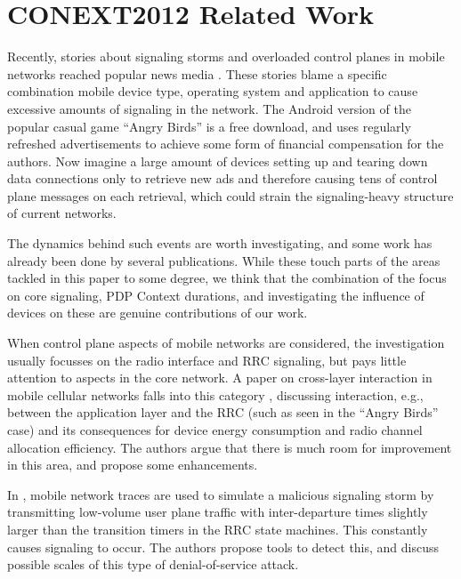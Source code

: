 \section{CONEXT2012 Related Work}



Recently, stories about signaling storms and overloaded control planes in mobile networks reached popular news media \cite{it2011birdandroid, lt2012docostorm}. These stories blame a specific combination mobile device type, operating system and application to cause excessive amounts of signaling in the network. The Android version of the popular casual game ``Angry Birds'' is a free download, and  uses regularly refreshed advertisements to achieve some form of financial compensation for the authors. Now imagine a large amount of devices setting up and tearing down data connections only to retrieve new ads and therefore causing tens of control plane messages on each retrieval, which could strain the signaling-heavy structure of current networks. 

The dynamics behind such events are worth investigating, and some work has already been done by several publications. While these touch parts of the areas tackled in this paper to some degree, we think that the combination of the focus on core signaling, PDP Context durations, and investigating the influence of devices on these are genuine contributions of our work.

When control plane aspects of mobile networks are considered, the investigation usually focusses on the radio interface and \ac{RRC} signaling, but pays little attention to aspects in the core network. A paper on cross-layer interaction in mobile cellular networks falls into this category \cite{qian2011profiling}, discussing interaction, e.g., between the application layer and the \ac{RRC} (such as seen in the ``Angry Birds'' case) and its consequences for device energy consumption and radio channel allocation efficiency. The authors argue that there is much room for improvement in this area, and propose some enhancements.

In \cite{lee2007detection}, mobile network traces are used to simulate a malicious signaling storm by transmitting low-volume user plane traffic with inter-departure times slightly larger than the transition timers in the \ac{RRC} state machines. This constantly causes signaling to occur. The authors propose tools to detect this, and discuss possible scales of this type of denial-of-service attack.

